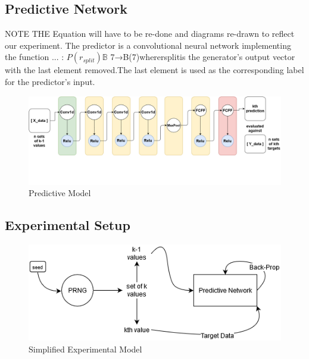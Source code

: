 \documentclass[conference]{IEEEtran}
\begin{document}
\subsection{Predictive Network}
NOTE THE Equation will have to be re-done and diagrams re-drawn to reflect our experiment.
The predictor is a convolutional neural network implementing the function ...
: $P(r_{split}) \mathbb{B}$ 7→B(7)wherersplitis  the  generator’s  output  vector  with  the  last  element  removed.The  last  element  is  used  as  the  corresponding  label  for  the  predictor’s  input.
\begin{figure}[H]
\centering
\includegraphics[width=1\linewidth]{./Images/PredictiveModel.png}
\caption{Predictive Model}
\label{fig:globfig}
\end{figure}

\subsection{Experimental Setup}
\begin{figure}[H]
\centering
\includegraphics[width=1\linewidth]{./Images/SimpleModel.png}
\caption{Simplified Experimental Model}
\label{fig:globfig}
\end{figure}
\end{document}
